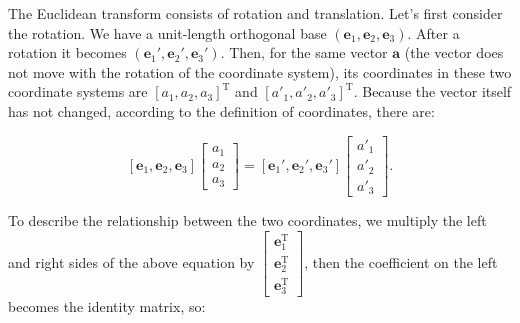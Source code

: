 The Euclidean transform consists of rotation and translation. Let's first consider the rotation. We have a unit-length orthogonal base $ ( \mathbf {e}_ 1, \mathbf {e}_ 2, \mathbf {e}_ 3 ) $. After a rotation it becomes $ ( \mathbf {e}_ 1 ', \mathbf {e}_ 2 ', \mathbf {e}_ 3 ') $. Then, for the same vector $ \mathbf {a} $ (the vector does not move with the rotation of the coordinate system), its coordinates in these two coordinate systems are $ [a_ 1, a_ 2, a_ 3 ] ^ \mathrm {T} $ and $[a'_ 1, a'_ 2, a'_ 3 ]^ \mathrm {T} $. Because the vector itself has not changed, according to the definition of coordinates, there are:

\begin{equation}
\left[ \mathbf{e}_1,\mathbf{e}_2,\mathbf{e}_3 \right]\left[ \begin{array}{l}
{a_1}\\
{a_2}\\
{a_3}
\end{array} \right] = \left[ \mathbf{e}_1', \mathbf{e}_2', \mathbf{e}_3' \right]\left[ \begin{array}{l}
a'_1\\
a'_2\\
a'_3
\end{array} \right].
\end{equation}

To describe the relationship between the two coordinates, we multiply the left and right sides of the above equation by $ \left [ \begin {array}{l}
\mathbf{e}_1^\mathrm{T}\\
\mathbf{e}_2^\mathrm{T}\\
\mathbf{e}_3^\mathrm{T}
\end {array} \right ] $, then the coefficient on the left becomes the identity matrix, so:

